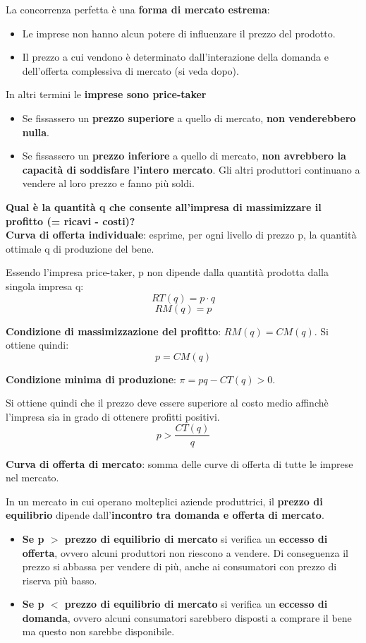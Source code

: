 \documentclass[../main.tex]{subfiles}
\begin{document}
La concorrenza perfetta è una \textbf{forma di mercato estrema}:
\begin{itemize}
    \item Le imprese non hanno alcun potere di influenzare il prezzo del prodotto.
    \item Il prezzo a cui vendono è determinato dall'interazione della domanda e dell'offerta complessiva di mercato (si veda dopo).
\end{itemize}

In altri termini le \textbf{imprese sono price-taker}
\begin{itemize}
    \item Se fissassero un \textbf{prezzo superiore} a quello di mercato, \textbf{non venderebbero nulla}.
    \item Se fissassero un \textbf{prezzo inferiore} a quello di mercato, \textbf{non avrebbero la capacità di soddisfare l'intero mercato}. Gli altri produttori continuano a vendere al loro prezzo e fanno più soldi.
\end{itemize}

\textbf{Qual è la quantità q che consente all'impresa di massimizzare il profitto (= ricavi - costi)?} \\

\textbf{Curva di offerta individuale}: esprime, per ogni livello di prezzo p, la quantità ottimale q di produzione del bene.

Essendo l'impresa price-taker, p non dipende dalla quantità prodotta dalla singola impresa q:
$$RT(q) = p\cdot q$$
$$RM(q) = p$$

\textbf{Condizione di massimizzazione del profitto}: $RM(q) = CM(q)$. Si ottiene quindi:
$$p = CM(q)$$

\textbf{Condizione minima di produzione}: $\pi = pq - CT(q) > 0$.

Si ottiene quindi che il prezzo deve essere superiore al costo medio affinchè l'impresa sia in grado di ottenere profitti positivi.
$$p > \frac{CT(q)}{q}$$

\textbf{Curva di offerta di mercato}: somma delle curve di offerta di tutte le imprese nel mercato.

In un mercato in cui operano molteplici aziende produttrici, il \textbf{prezzo di equilibrio} dipende dall'\textbf{incontro tra domanda e offerta di mercato}.

\begin{itemize}
    \item \textbf{Se p $>$ prezzo di equilibrio di mercato} si verifica un \textbf{eccesso di offerta}, ovvero alcuni produttori non riescono a vendere. Di conseguenza il prezzo si abbassa per vendere di più, anche ai consumatori con prezzo di riserva più basso.
    \item \textbf{Se p $<$ prezzo di equilibrio di mercato} si verifica un \textbf{eccesso di domanda}, ovvero alcuni consumatori sarebbero disposti a comprare il bene ma questo non sarebbe disponibile.
\end{itemize}
\end{document}
